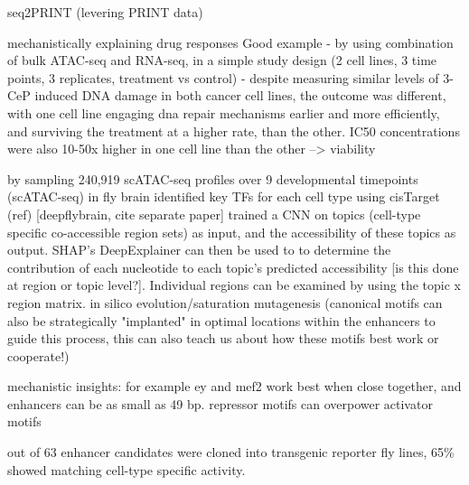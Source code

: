 seq2PRINT (levering PRINT data)

mechanistically explaining drug responses Good example
- by using combination of bulk ATAC-seq and RNA-seq, in a simple study design (2 cell lines, 3 time points, 3 replicates, treatment vs control)
- despite measuring similar levels of 3-CeP induced DNA damage in both cancer cell lines, the outcome was different, with one cell line engaging dna repair mechanisms earlier and more efficiently, and surviving the treatment at a higher rate, than the other. IC50 concentrations were also 10-50x higher in one cell line than the other --> viability


by sampling 240,919 scATAC-seq profiles over 9 developmental timepoints (scATAC-seq) in fly brain
identified key TFs for each cell type using cisTarget (ref)
[deepflybrain, cite separate paper] trained a CNN on topics (cell-type specific co-accessible region sets) as input, and the accessibility of these topics as output. SHAP's DeepExplainer can then be used to to determine the contribution of each nucleotide to each topic's predicted accessibility [is this done at region or topic level?]. Individual regions can be examined by using the topic x region matrix. in silico evolution/saturation mutagenesis (canonical motifs can also be strategically "implanted" in optimal locations within the enhancers to guide this process, this can also teach us about how these motifs best work or cooperate!)

mechanistic insights: for example ey and mef2 work best when close together, and enhancers can be as small as 49 bp. repressor motifs can overpower activator motifs

out of 63 enhancer candidates were cloned into transgenic reporter fly lines, 65\% showed matching cell-type specific activity.

